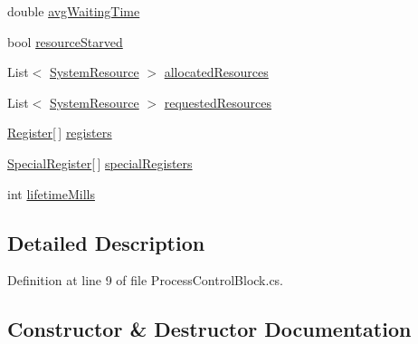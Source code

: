 \begin{DoxyCompactItemize}
\item 
double \hyperlink{class_c_p_u___o_s___simulator_1_1_operating___system_1_1_process_control_block_ab2aadabc87960312728806d747db342c}{avg\+Waiting\+Time}
\item 
bool \hyperlink{class_c_p_u___o_s___simulator_1_1_operating___system_1_1_process_control_block_a78ae58aafcca78f88f6c4a979186d45e}{resource\+Starved}
\item 
List$<$ \hyperlink{class_c_p_u___o_s___simulator_1_1_operating___system_1_1_system_resource}{System\+Resource} $>$ \hyperlink{class_c_p_u___o_s___simulator_1_1_operating___system_1_1_process_control_block_a2bf5eeea4cfbc85d2eea2d7fca022d42}{allocated\+Resources}
\item 
List$<$ \hyperlink{class_c_p_u___o_s___simulator_1_1_operating___system_1_1_system_resource}{System\+Resource} $>$ \hyperlink{class_c_p_u___o_s___simulator_1_1_operating___system_1_1_process_control_block_a7896862017234b7736e377b5a0e3a253}{requested\+Resources}
\item 
\hyperlink{class_c_p_u___o_s___simulator_1_1_c_p_u_1_1_register}{Register}\mbox{[}$\,$\mbox{]} \hyperlink{class_c_p_u___o_s___simulator_1_1_operating___system_1_1_process_control_block_abf1ea0cffc667a8119d25d8a9c283483}{registers}
\item 
\hyperlink{class_c_p_u___o_s___simulator_1_1_c_p_u_1_1_special_register}{Special\+Register}\mbox{[}$\,$\mbox{]} \hyperlink{class_c_p_u___o_s___simulator_1_1_operating___system_1_1_process_control_block_a1e39a81f5ee1a47350ee3a77cf331646}{special\+Registers}
\item 
int \hyperlink{class_c_p_u___o_s___simulator_1_1_operating___system_1_1_process_control_block_a31259298bf00ca63f7a9f879f0e67c45}{lifetime\+Mills}
\end{DoxyCompactItemize}


\subsection{Detailed Description}


Definition at line 9 of file Process\+Control\+Block.\+cs.



\subsection{Constructor \& Destructor Documentation}
\hypertarget{class_c_p_u___o_s___simulator_1_1_operating___system_1_1_process_control_block_a8af7f052d1a03e35f7298407df2055e7}{}
